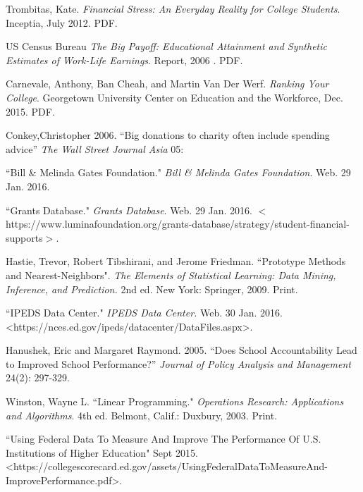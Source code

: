 \documentclass[12pt]{scrartcl}
\begin{document}
\begin{thebibliography}{10}
	 Trombitas, Kate.  \emph{Financial Stress: An Everyday Reality for College Students}. Inceptia, July 2012. PDF.
	
	 US Census Bureau  \emph{The Big Payoff: Educational Attainment and Synthetic Estimates of Work-Life Earnings}. Report, 2006 . PDF. 

	 Carnevale, Anthony, Ban Cheah, and Martin Van Der Werf. \emph{Ranking Your College}. Georgetown University Center on Education and the Workforce, Dec. 2015. PDF.
	
	 Conkey,Christopher 2006. ``Big donations to charity often include spending advice” \emph{The Wall Street Journal Asia} 05:
	
	 ``Bill \& Melinda Gates Foundation." \emph{Bill \& Melinda Gates Foundation}. Web. 29 Jan. 2016. 
	
	 ``Grants Database." \emph{Grants Database}. Web. 29 Jan. 2016. $<$https://www.luminafoundation.org/grants-database/strategy/student-financial-supports$>$. 

	 Hastie, Trevor, Robert Tibshirani, and Jerome Friedman. ``Prototype Methods and Nearest-Neighbors". \emph{The Elements of Statistical Learning: Data Mining, Inference, and Prediction.} 2nd ed. New York: Springer, 2009. Print. 

	 ``IPEDS Data Center." \emph{IPEDS Data Center.} Web. 30 Jan. 2016. \textless https://nces.ed.gov/ipeds/datacenter/DataFiles.aspx\textgreater.

	 Hanushek, Eric and Margaret Raymond. 2005. ``Does School Accountability Lead to Improved School Performance?” \emph{Journal of Policy Analysis and Management} 24(2): 297-329.
	
	 Winston, Wayne L. ``Linear Programming."  \emph{Operations Research: Applications and Algorithms}. 4th ed. Belmont, Calif.: Duxbury, 2003. Print.
	
	 ``Using Federal Data To Measure And Improve The Performance Of U.S. Institutions of Higher Education" Sept 2015. \textless https://collegescorecard.ed.gov/assets/UsingFederalDataToMeasureAnd- \\ImprovePerformance.pdf\textgreater.
\end{thebibliography}
\end{document}

